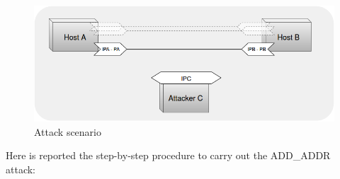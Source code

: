 \begin{figure}[!htb]
\centering
\includegraphics[width=\textwidth]{images/Attack1}
\caption{Attack scenario}
\label{fig:attack1}
\end{figure}

Here is reported the step-by-step procedure to carry out the ADD\_ADDR attack:

